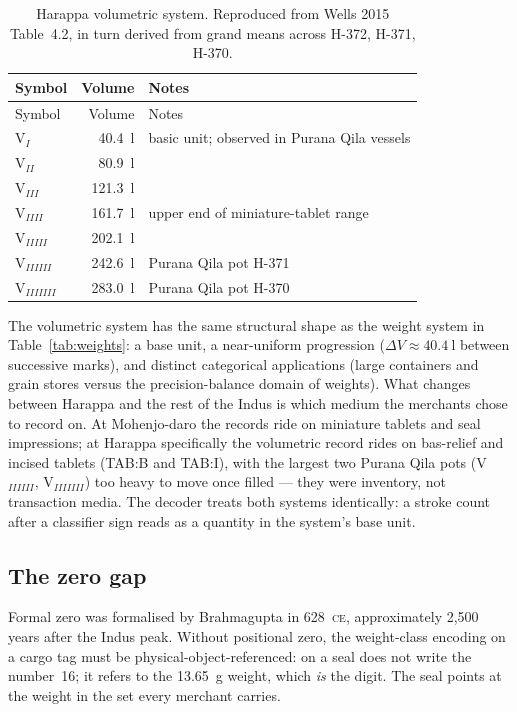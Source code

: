 \begin{longtable}{@{}lrl@{}}
\caption{Harappa volumetric system. Reproduced from Wells 2015 Table~4.2,
in turn derived from grand means across H-372, H-371, H-370.}
\label{tab:volumes}\\
\toprule
Symbol & Volume & Notes \\
\midrule
\endfirsthead
\toprule
Symbol & Volume & Notes \\
\midrule
\endhead
\bottomrule
\endlastfoot
V$_I$       & \SI{40.4}{\litre}  & basic unit; observed in Purana Qila vessels \\
\midrule
V$_{II}$    & \SI{80.9}{\litre}  & \\
\midrule
V$_{III}$   & \SI{121.3}{\litre} & \\
\midrule
V$_{IIII}$  & \SI{161.7}{\litre} & upper end of miniature-tablet range \\
\midrule
V$_{IIIII}$ & \SI{202.1}{\litre} & \\
\midrule
V$_{IIIIII}$  & \SI{242.6}{\litre} & Purana Qila pot H-371 \\
\midrule
V$_{IIIIIII}$ & \SI{283.0}{\litre} & Purana Qila pot H-370 \\
\end{longtable}

The volumetric system has the same structural shape as the weight system
in Table~\ref{tab:weights}: a base unit, a near-uniform progression
($\Delta V \approx \SI{40.4}{\litre}$ between successive marks), and
distinct categorical applications (large containers and grain stores
versus the precision-balance domain of weights). What changes between
Harappa and the rest of the Indus is which medium the merchants chose
to record on. At Mohenjo-daro the records ride on miniature tablets and
seal impressions; at Harappa specifically the volumetric record rides
on bas-relief and incised tablets (TAB:B and TAB:I), with the largest
two Purana Qila pots (V$_{IIIIII}$, V$_{IIIIIII}$) too heavy to move
once filled --- they were inventory, not transaction
media.\smartcite{Wells2015}
The decoder treats both systems identically: a stroke count after a
classifier sign reads as a quantity in the system's base unit.

\subsection{The zero gap}

Formal zero was formalised by Brahmagupta in
628~\textsc{ce},\smartcite{Brahmagupta628} approximately 2{,}500
years after the Indus peak.
Without positional zero, the weight-class encoding on a cargo tag
must be physical-object-referenced:  on a seal does not
write the number~16; it refers to the \SI{13.65}{\gram} weight,
which \emph{is} the digit.
The seal points at the weight in the set every merchant carries.

